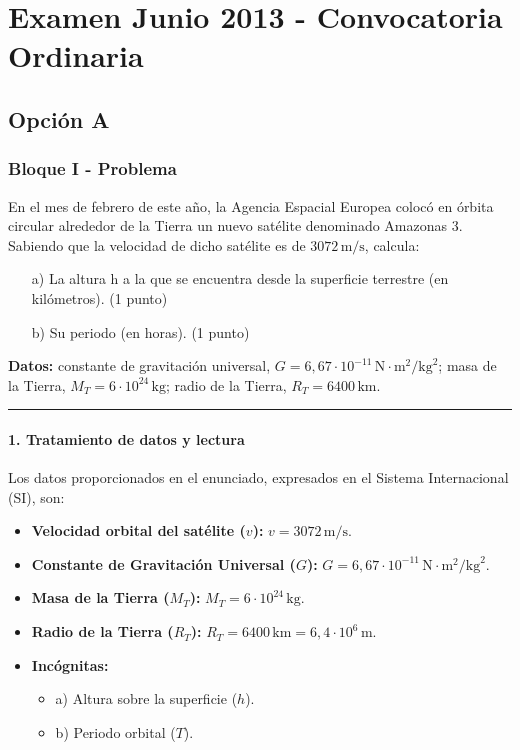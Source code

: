 \chapter{Examen Junio 2013 - Convocatoria Ordinaria}
\label{chap:2013_jun_ord}

\section{Opción A}
\label{sec:A_2013_jun_ord}

\subsection{Bloque I - Problema}
\label{subsec:I_A_2013_jun_ord}

\begin{cajaenunciado}
En el mes de febrero de este año, la Agencia Espacial Europea colocó en órbita circular alrededor de la Tierra un nuevo satélite denominado Amazonas 3. Sabiendo que la velocidad de dicho satélite es de $3072\,\text{m/s}$, calcula:
\begin{enumerate}
    \item[a)] La altura h a la que se encuentra desde la superficie terrestre (en kilómetros). (1 punto)
    \item[b)] Su periodo (en horas). (1 punto)
\end{enumerate}
\textbf{Datos:} constante de gravitación universal, $G=6,67\cdot10^{-11}\,\text{N}\cdot\text{m}^2/\text{kg}^2$; masa de la Tierra, $M_{T}=6\cdot10^{24}\,\text{kg}$; radio de la Tierra, $R_{T}=6400\,\text{km}$.
\end{cajaenunciado}
\hrule

\subsubsection*{1. Tratamiento de datos y lectura}
Los datos proporcionados en el enunciado, expresados en el Sistema Internacional (SI), son:
\begin{itemize}
    \item \textbf{Velocidad orbital del satélite ($v$):} $v = 3072 \, \text{m/s}$.
    \item \textbf{Constante de Gravitación Universal ($G$):} $G = 6,67 \cdot 10^{-11} \, \text{N}\cdot\text{m}^2/\text{kg}^2$.
    \item \textbf{Masa de la Tierra ($M_T$):} $M_T = 6 \cdot 10^{24} \, \text{kg}$.
    \item \textbf{Radio de la Tierra ($R_T$):} $R_T = 6400 \, \text{km} = 6,4 \cdot 10^6 \, \text{m}$.
    \item \textbf{Incógnitas:}
    \begin{itemize}
        \item a) Altura sobre la superficie ($h$).
        \item b) Periodo orbital ($T$).
    \end{itemize}
\end{itemize}

